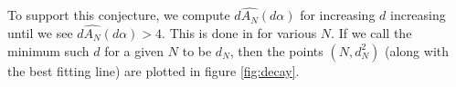 \documentclass{report}
\theoremstyle{remark}
\numberwithin{equation}{section}
\begin{document}





To support this conjecture, we compute $d \widehat{A_N}(d\alpha)$ for
increasing $d$ increasing until we see $d \widehat{A_N}(d\alpha) > 4$.
This is done in  for various $N$.  If we call the
minimum such $d$ for a given $N$ to be $d_N$, then the points
$(N, d_N^2)$ (along with the best fitting line) are plotted in figure
\ref{fig:decay}.  
\end{document}
